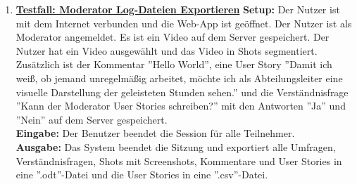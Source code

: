 \begin{enumerate}
	
	\item \underline{\textbf{Testfall: Moderator Log-Dateien Exportieren}} \linebreak
	\textbf{Setup:} Der Nutzer ist mit dem Internet verbunden und die Web-App ist geöffnet. Der Nutzer ist als Moderator angemeldet. Es ist ein Video auf dem Server gespeichert. Der Nutzer hat ein Video ausgewählt und das Video in Shots segmentiert. Zusätzlich ist der Kommentar ''Hello World'', eine User Story ''Damit ich weiß, ob jemand unregelmäßig arbeitet,
möchte ich als Abteilungsleiter eine visuelle Darstellung der geleisteten Stunden sehen.'' und die Verständnisfrage ''Kann der Moderator User Stories schreiben?'' mit den Antworten ''Ja'' und ''Nein'' auf dem Server gespeichert. \\
	\textbf{Eingabe:} Der Benutzer beendet die Session für alle Teilnehmer. \\
	\textbf{Ausgabe:} Das System beendet die Sitzung und exportiert alle Umfragen, Verständnisfragen, Shots mit Screenshots, Kommentare und User Stories in eine ''.odt''-Datei und die User Stories in eine ''.csv''-Datei.\\ 
	
\end{enumerate}
